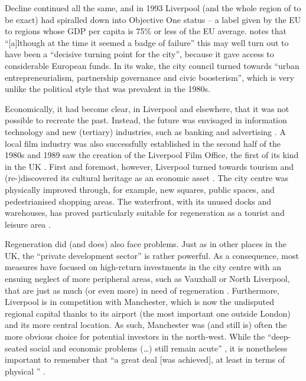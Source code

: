 Decline continued all the same, and in 1993 Liverpool (and the whole region of  to be exact) had spiralled down into Objective One status -- a label given by the EU to regions whose GDP per capita is 75\% or less of the EU average.
\citet[53--54]{belchem2006a} notes that ``[a]lthough at the time it seemed a badge of failure'' this may well turn out to have been a ``decisive turning point for the city'', because it gave access to considerable European funds.
In its wake, the city council turned towards ``urban entrepreneurialism, partnership governance and civic boosterism'', which is very unlike the political style that was prevalent in the 1980s.

\largerpage
Economically, it had become clear, in Liverpool and elsewhere, that it was not possible to recreate the past.
Instead, the future was envisaged in information technology and new (tertiary) industries, such as banking and advertising \citep[cf.][32]{fraser2003}.
A local film industry was also successfully established in the second half of the 1980s and 1989 saw the creation of the Liverpool Film Office, the first of its kind in the UK \citep[cf.][479]{murden2006}.
First and foremost, however, Liverpool turned towards tourism and (re-)discovered its cultural heritage as an economic asset \citep[cf.][32--33]{fraser2003}.
The city centre was physically improved through, for example, new squares, public spaces, and pedestrianised shopping areas.
The waterfront, with its unused docks and warehouses, has proved particularly suitable for regeneration as a tourist and leisure area \citep[173--174]{couch2003a}.

Regeneration did (and does) also face problems.
Just as in other places in the UK, the ``private development sector'' is rather powerful.
As a consequence, most measures have focused on high-return investments in the city centre with an ensuing neglect of more peripheral areas, such as Vauxhall or North Liverpool, that are just as much (or even more) in need of regeneration \citep[cf.][49]{couch2003}.
Furthermore, Liverpool is in competition with Manchester, which is now the undisputed regional capital thanks to its airport (the most important one outside London) and its more central location.
As such, Manchester was (and still is) often the more obvious choice for potential investors in the north-west.
While the ``deep-seated social and economic problems (\ldots) still remain acute'' \citep[188]{fraser2003a}, it is nonetheless important to remember that ``a great deal [was achieved], at least in terms of physical '' \citep[44]{couch2003}.

